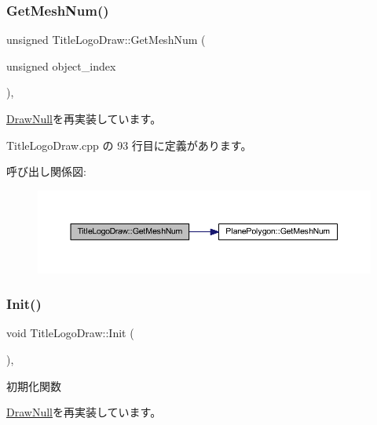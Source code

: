 \subsubsection{\texorpdfstring{Get\+Mesh\+Num()}{GetMeshNum()}}
{\footnotesize\ttfamily unsigned Title\+Logo\+Draw\+::\+Get\+Mesh\+Num (\begin{DoxyParamCaption}\item[{unsigned}]{object\+\_\+index }\end{DoxyParamCaption})\hspace{0.3cm}{\ttfamily [override]}, {\ttfamily [virtual]}}



\mbox{\hyperlink{class_draw_null_ad735978a85a5f3583eecd82d6bfe6413}{Draw\+Null}}を再実装しています。



 Title\+Logo\+Draw.\+cpp の 93 行目に定義があります。

呼び出し関係図\+:\nopagebreak
\begin{figure}[H]
\begin{center}
\leavevmode
\includegraphics[width=350pt]{class_title_logo_draw_a14212f1ee003c40d63db3822a84af7fb_cgraph}
\end{center}
\end{figure}
\mbox{\label{class_title_logo_draw_a9f70fb70639510908f4e07ee14667e30}} 
\subsubsection{\texorpdfstring{Init()}{Init()}}
{\footnotesize\ttfamily void Title\+Logo\+Draw\+::\+Init (\begin{DoxyParamCaption}{ }\end{DoxyParamCaption})\hspace{0.3cm}{\ttfamily [override]}, {\ttfamily [virtual]}}



初期化関数 



\mbox{\hyperlink{class_draw_null_acd7fef3ccea1da537ac9507ffbb6dd2e}{Draw\+Null}}を再実装しています。



